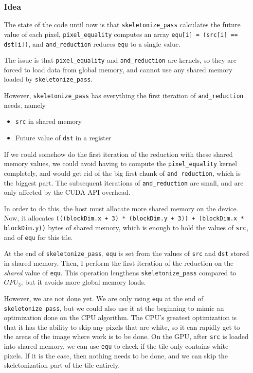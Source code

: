 \documentclass[11pt,a4paper]{article}
\begin{document}
            \subsubsection{Idea}
                The state of the code until now is that \verb+skeletonize_pass+ calculates the future value of each pixel, \verb+pixel_equality+ computes an array \verb+equ[i] = (src[i] == dst[i])+, and \verb+and_reduction+ reduces \verb+equ+ to a single value.

                The issue is that \verb+pixel_equality+ and \verb+and_reduction+ are kernels, so they are forced to load data from global memory, and cannot use any shared memory loaded by \verb+skeletonize_pass+.

                However, \verb+skeletonize_pass+ has everything the first iteration of \verb+and_reduction+ needs, namely

                \begin{itemize}
                    \item \verb+src+ in shared memory
                    \item Future value of \verb+dst+ in a register
                \end{itemize}

                If we could somehow do the first iteration of the reduction with these shared memory values, we could avoid having to compute the \verb+pixel_equality+ kernel completely, and would get rid of the big first chunk of \verb+and_reduction+, which is the biggest part.
                The subsequent iterations of \verb+and_reduction+ are small, and are only affected by the CUDA API overhead.

                In order to do this, the host must allocate more shared memory on the device.
                Now, it allocates \verb|(((blockDim.x + 3) * (blockDim.y + 3)) + (blockDim.x * blockDim.y))| bytes of shared memory, which is enough to hold the values of \verb+src+, and of \verb+equ+ for this tile.

                At the end of \verb+skeletonize_pass+, \verb+equ+ is set from the values of \verb+src+ and \verb+dst+ stored in shared memory.
                Then, I perform the first iteration of the reduction on the \emph{shared} value of \verb+equ+.
                This operation lengthens \verb+skeletonize_pass+ compared to $GPU_{3}$, but it avoids more global memory loads.

                However, we are not done yet. We are only using \verb+equ+ at the end of \verb+skeletonize_pass+, but we could also use it at the beginning to mimic an optimization done on the CPU algorithm.
                The CPU's greatest optimization is that it has the ability to skip any pixels that are white, so it can rapidly get to the areas of the image where work is to be done.
                On the GPU, after \verb+src+ is loaded into shared memory, we can use \verb+equ+ to check if the tile only contains white pixels. If it is the case, then nothing needs to be done, and we can skip the skeletonization part of the tile entirely.
\end{document}
